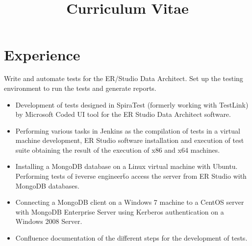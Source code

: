 \documentclass[11pt,a4paper,sans]{moderncv}
\title{Curriculum Vitae}               %
\begin{document}
\maketitle

\section{Experience}

%
%

{Write and automate tests for the ER/Studio Data Architect. Set up the testing environment to run the tests and generate reports. 
\newline{}\newline{}
\begin{itemize}
\item Development of tests designed in SpiraTest (formerly working with TestLink) by Microsoft Coded UI tool for the ER Studio Data Architect software.
\item Performing various tasks in Jenkins as the compilation of tests in a virtual machine development, ER Studio software installation and execution of test suite obtaining the result of the execution of x86 and x64 machines.
\item Installing a MongoDB database on a Linux virtual machine with Ubuntu. Performing tests of \"reverse engineer\" to access the server from ER Studio with MongoDB databases.
\item Connecting a MongoDB client on a Windows 7 machine to a CentOS server with MongoDB Enterprise Server using Kerberos authentication on a Windows 2008 Server.
\item Confluence documentation of the different steps for the development of tests.
\end{itemize}}
\end{document}
